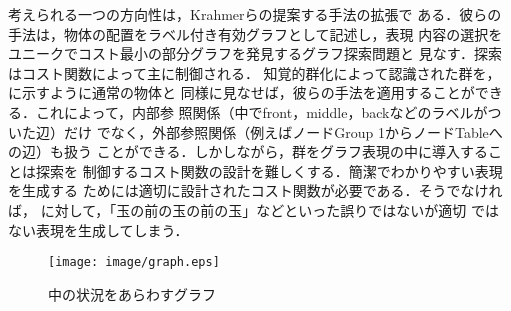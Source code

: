 \documentclass{nlp}
\begin{document}
考えられる一つの方向性は，Krahmerらの提案する手法\cite{EK2003}の拡張で
ある．彼らの手法は，物体の配置をラベル付き有効グラフとして記述し，表現
内容の選択をユニークでコスト最小の部分グラフを発見するグラフ探索問題と
見なす．探索はコスト関数によって主に制御される．
知覚的群化によって認識された群を，に示すように通常の物体と
同様に見なせば，彼らの手法を適用することができる．これによって，内部参
照関係（中でfront，middle，backなどのラベルがついた辺）だけ
でなく，外部参照関係（例えばノードGroup 1からノードTableへの辺）も扱う
ことができる．しかしながら，群をグラフ表現の中に導入することは探索を
制御するコスト関数の設計を難しくする．簡潔でわかりやすい表現を生成する
ためには適切に設計されたコスト関数が必要である．そうでなければ，
に対して，「玉の前の玉の前の玉」などといった誤りではないが適切
ではない表現を生成してしまう．


\begin{figure}[hbt]
  \centering
  \texttt{[image: image/graph.eps]}
  \caption{中の状況をあらわすグラフ}
  \label{graph}
\end{figure}
\end{document}
